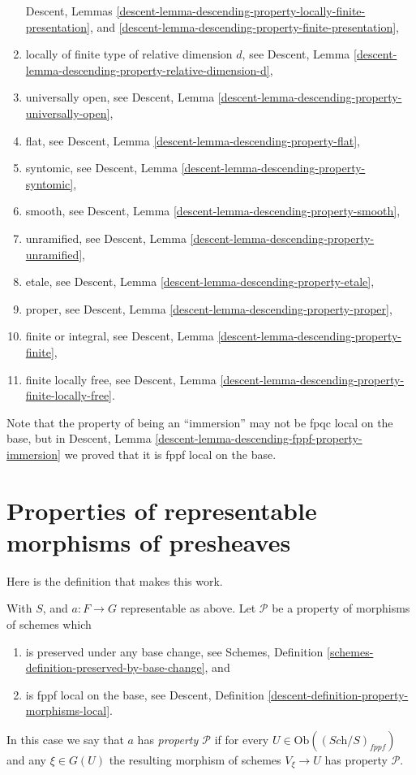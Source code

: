 \begin{remark}
\begin{enumerate}
Descent, Lemmas
\ref{descent-lemma-descending-property-locally-finite-presentation}, and
\ref{descent-lemma-descending-property-finite-presentation},
\item locally of finite type of relative dimension $d$, see
Descent,
Lemma \ref{descent-lemma-descending-property-relative-dimension-d},
\item universally open, see
Descent, Lemma \ref{descent-lemma-descending-property-universally-open},
\item flat, see
Descent, Lemma \ref{descent-lemma-descending-property-flat},
\item syntomic, see
Descent, Lemma \ref{descent-lemma-descending-property-syntomic},
\item smooth, see
Descent, Lemma \ref{descent-lemma-descending-property-smooth},
\item unramified, see
Descent, Lemma \ref{descent-lemma-descending-property-unramified},
\item etale, see
Descent, Lemma \ref{descent-lemma-descending-property-etale},
\item proper, see
Descent, Lemma \ref{descent-lemma-descending-property-proper},
\item finite or integral, see
Descent, Lemma \ref{descent-lemma-descending-property-finite},
\item finite locally free, see
Descent,
Lemma \ref{descent-lemma-descending-property-finite-locally-free}.
\end{enumerate}
Note that the property of being an ``immersion'' may not be fpqc local
on the base, but in
Descent, Lemma \ref{descent-lemma-descending-fppf-property-immersion}
we proved that it is fppf local on the base.
\end{remark}








\section{Properties of representable morphisms of presheaves}
\label{section-representable-properties}

\noindent
Here is the definition that makes this work.

\begin{definition}
\label{definition-relative-representable-property}
With $S$, and $a : F \to G$ representable as above.
Let $\mathcal{P}$ be a property of morphisms of schemes which
\begin{enumerate}
\item is preserved under any base change,
see Schemes, Definition \ref{schemes-definition-preserved-by-base-change},
and
\item is fppf local on the base, see
Descent, Definition \ref{descent-definition-property-morphisms-local}.
\end{enumerate}
In this case we say that $a$ has {\it property $\mathcal{P}$} if for every
$U \in \text{Ob}((\textit{Sch}/S)_{fppf})$ and
any $\xi \in G(U)$ the resulting morphism of schemes
$V_\xi \to U$ has property $\mathcal{P}$.
\end{definition}

